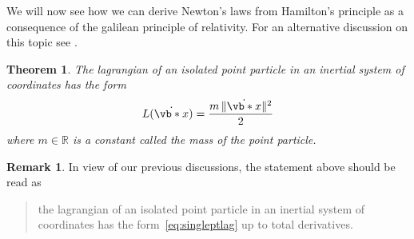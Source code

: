 \documentclass[english,fontsize=11pt,paper=b5]{scrbook}
\numberwithin{equation}{chapter}
\newtheorem{theorem}{Theorem}[chapter]
\theoremstyle{definition}
\newtheorem{remark}{Remark}[chapter]
\begin{document}
    We will now see how we can derive Newton's laws from Hamilton's principle as a consequence of the galilean principle of relativity. For an alternative discussion on this topic see \cite[Chapters 1.1 and 1.2]{book:arnold}.

    \begin{theorem}
      The lagrangian of an isolated point particle in an inertial system of coordinates has the form
      \begin{equation}\label{eq:singleptlag}
        L(\dot{\vb*{x}}) = \frac{m\,\|\dot{\vb*{x}}\|^2}2
      \end{equation}
      where $m\in\mathbb{R}$ is a constant called the \emph{mass} of the point particle.
    \end{theorem}
    \begin{remark}
      In view of our previous discussions, the statement above should be read as
      \begin{quote}
        the lagrangian of an isolated point particle in an inertial system of coordinates has the form~\eqref{eq:singleptlag} up to total derivatives.
    \end{quote}
    \end{remark}
\end{document}
